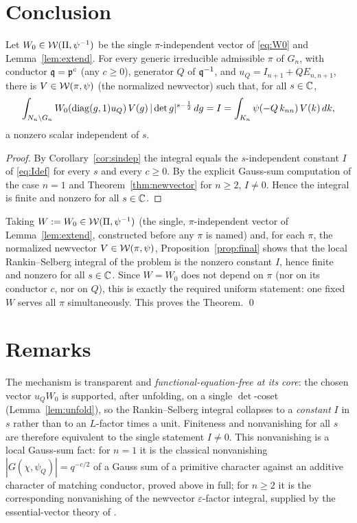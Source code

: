 \section*{Conclusion}

\begin{qtwoproposition}\label{prop:final}
Let $W_0\in\mathcal{W}(\Pi,\psi^{-1})$ be the single $\pi$-independent vector of \eqref{eq:W0} and
Lemma~\ref{lem:extend}. For every generic irreducible admissible $\pi$ of $G_n$, with conductor
$\mathfrak{q}=\mathfrak{p}^{c}$ \textup{(}any $c\ge0$\textup{)}, generator $Q$ of $\mathfrak{q}^{-1}$, and
$u_Q=I_{n+1}+QE_{n,n+1}$, there is $V\in\mathcal{W}(\pi,\psi)$ \textup{(}the normalized newvector\textup{)}
such that, for all $s\in\mathbb{C}$,
\[
\int_{N_n\backslash G_n} W_0(\operatorname{diag}(g,1)u_Q)\,V(g)\,|\det g|^{s-\frac12}\,dg
= I=\int_{K_n}\psi(-Q\,k_{nn})\,V(k)\,dk,
\]
a nonzero scalar independent of $s$.
\end{qtwoproposition}

\begin{proof}
By Corollary~\ref{cor:sindep} the integral equals the $s$-independent constant $I$ of
\eqref{eq:Idef} for every $s$ and every $c\ge0$. By the explicit Gauss-sum computation of the case
$n=1$ and Theorem~\ref{thm:newvector} for $n\ge2$, $I\neq0$. Hence the integral is finite and
nonzero for all $s\in\mathbb{C}$.
\end{proof}

Taking $W:=W_0\in\mathcal{W}(\Pi,\psi^{-1})$ \textup{(}the single, $\pi$-independent vector of
Lemma~\ref{lem:extend}, constructed before any $\pi$ is named\textup{)} and, for each $\pi$, the
normalized newvector $V\in\mathcal{W}(\pi,\psi)$, Proposition~\ref{prop:final} shows that the local
Rankin--Selberg integral of the problem is the nonzero constant $I$, hence finite and nonzero for
all $s\in\mathbb{C}$. Since $W=W_0$ does not depend on $\pi$ \textup{(}nor on its conductor $c$, nor on
$Q$\textup{)}, this is exactly the required uniform statement: one fixed $W$ serves all $\pi$
simultaneously. This proves the Theorem. \qed

\section*{Remarks}

The mechanism is transparent and \emph{functional-equation-free at its core}: the chosen vector
$u_Q W_0$ is supported, after unfolding, on a single $\det$-coset
\textup{(}Lemma~\ref{lem:unfold}\textup{)}, so the Rankin--Selberg integral collapses to a
\emph{constant} $I$ in $s$ rather than to an $L$-factor times a unit. Finiteness and nonvanishing
for all $s$ are therefore equivalent to the single statement $I\neq0$. This nonvanishing is a
local Gauss-sum fact: for $n=1$ it is the classical nonvanishing $|G(\chi,\psi_Q)|=q^{-c/2}$ of a
Gauss sum of a primitive character against an additive character of matching conductor, proved
above in full; for $n\ge2$ it is the corresponding nonvanishing of the newvector
$\varepsilon$-factor integral, supplied by the essential-vector theory of \cite{JPSS81,Matringe}.

